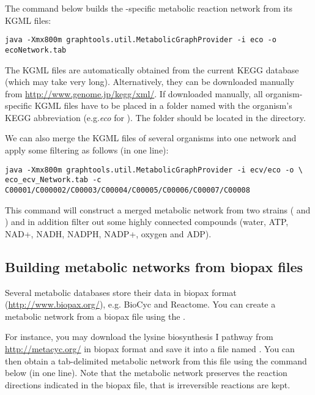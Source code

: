 
The command below builds the -specific metabolic reaction network
from its KGML files:

\begin{lstlisting}
java -Xmx800m graphtools.util.MetabolicGraphProvider -i eco -o ecoNetwork.tab
\end{lstlisting}

The KGML files are automatically obtained from the current KEGG database
(which may take very long). Alternatively, they can be downloaded manually from
\url{http://www.genome.jp/kegg/xml/}.
If downloaded manually, all organism-specific KGML files have to be placed in a
folder named with the organism's KEGG abbreviation (e.g.\textit{eco}
for ). The folder should be located in the 
directory.
 
We can also merge the KGML files of several organisms into one network and apply
some filtering as follows (in one line):

\begin{lstlisting}
java -Xmx800m graphtools.util.MetabolicGraphProvider -i ecv/eco -o \
eco_ecv_Network.tab -c C00001/C000002/C00003/C00004/C00005/C00006/C00007/C00008
\end{lstlisting}

This command will construct a merged metabolic network from two
 strains ( and \org{Escherichia
coli O1 (APEC)}) 
and in addition filter out some highly connected compounds 
(water, ATP, NAD+, NADH, NADPH, NADP+, oxygen and ADP).

\subsection{Building metabolic networks from biopax files}

Several metabolic databases store their data in biopax format
(\url{http://www.biopax.org/}), e.g. BioCyc and Reactome. You can create
a metabolic network from a biopax file using the
.

For instance, you may download the lysine biosynthesis I pathway from
\url{http://metacyc.org/} in biopax format and save it into a file named
\file{lysine\_pwy1.xml}. You can then obtain a tab-delimited metabolic network
from this file using the command below (in one line). Note that the metabolic
network preserves the reaction directions indicated in the biopax file, that is irreversible reactions are
kept.

